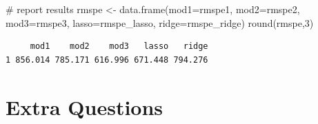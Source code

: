 \documentclass[
  letterpaper,
  DIV=11,
  numbers=noendperiod]{scrreprt}
\newenvironment{Shaded}{\begin{snugshade}}{\end{snugshade}}
\newcommand{\AttributeTok}[1]{\textcolor[rgb]{0.40,0.45,0.13}{#1}}
\newcommand{\CommentTok}[1]{\textcolor[rgb]{0.37,0.37,0.37}{#1}}
\newcommand{\DecValTok}[1]{\textcolor[rgb]{0.68,0.00,0.00}{#1}}
\newcommand{\FunctionTok}[1]{\textcolor[rgb]{0.28,0.35,0.67}{#1}}
\newcommand{\NormalTok}[1]{\textcolor[rgb]{0.00,0.23,0.31}{#1}}
\newcommand{\OtherTok}[1]{\textcolor[rgb]{0.00,0.23,0.31}{#1}}
\begin{document}
\begin{Shaded}
\begin{Highlighting}[]
\CommentTok{\# report results}
\NormalTok{rmspe }\OtherTok{\textless{}{-}} \FunctionTok{data.frame}\NormalTok{(}\AttributeTok{mod1=}\NormalTok{rmspe1, }\AttributeTok{mod2=}\NormalTok{rmspe2, }\AttributeTok{mod3=}\NormalTok{rmspe3, }\AttributeTok{lasso=}\NormalTok{rmspe\_lasso, }\AttributeTok{ridge=}\NormalTok{rmspe\_ridge)}
\FunctionTok{round}\NormalTok{(rmspe,}\DecValTok{3}\NormalTok{)}
\end{Highlighting}
\end{Shaded}

\begin{verbatim}
     mod1    mod2    mod3   lasso   ridge
1 856.014 785.171 616.996 671.448 794.276
\end{verbatim}

\section{Extra Questions}\label{extra-questions-4}
\end{document}
